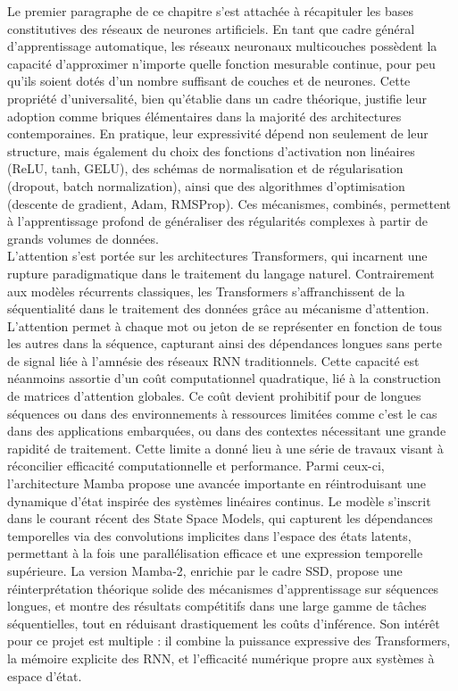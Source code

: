 Le premier paragraphe de ce chapitre s’est attachée à récapituler les bases constitutives des réseaux de neurones artificiels. En tant que cadre général d’apprentissage automatique, les réseaux neuronaux multicouches possèdent la capacité d’approximer n’importe quelle fonction mesurable continue, pour peu qu’ils soient dotés d’un nombre suffisant de couches et de neurones. Cette propriété d’universalité, bien qu’établie dans un cadre théorique, justifie leur adoption comme briques élémentaires dans la majorité des architectures contemporaines. En pratique, leur expressivité dépend non seulement de leur structure, mais également du choix des fonctions d’activation non linéaires (ReLU, tanh, GELU), des schémas de normalisation et de régularisation (dropout, batch normalization), ainsi que des algorithmes d’optimisation (descente de gradient, Adam, RMSProp). Ces mécanismes, combinés, permettent à l’apprentissage profond de généraliser des régularités complexes à partir de grands volumes de données.\\

L’attention s’est portée sur les architectures Transformers, qui incarnent une rupture paradigmatique dans le traitement du langage naturel. Contrairement aux modèles récurrents classiques, les Transformers s’affranchissent de la séquentialité dans le traitement des données grâce au mécanisme d’attention. L’attention permet à chaque mot ou jeton de se représenter en fonction de tous les autres dans la séquence, capturant ainsi des dépendances longues sans perte de signal liée à l’amnésie des réseaux RNN traditionnels. Cette capacité est néanmoins assortie d’un coût computationnel quadratique, lié à la construction de matrices d’attention globales. Ce coût devient prohibitif pour de longues séquences ou dans des environnements à ressources limitées comme c’est le cas dans des applications embarquées, ou dans des contextes nécessitant une grande rapidité de traitement. Cette limite a donné lieu à une série de travaux visant à réconcilier efficacité computationnelle et performance. Parmi ceux-ci, l’architecture Mamba propose une avancée importante en réintroduisant une dynamique d’état inspirée des systèmes linéaires continus. Le modèle s’inscrit dans le courant récent des State Space Models, qui capturent les dépendances temporelles via des convolutions implicites dans l’espace des états latents, permettant à la fois une parallélisation efficace et une expression temporelle supérieure. La version Mamba-2, enrichie par le cadre SSD, propose une réinterprétation théorique solide des mécanismes d’apprentissage sur séquences longues, et montre des résultats compétitifs dans une large gamme de tâches séquentielles, tout en réduisant drastiquement les coûts d’inférence. Son intérêt pour ce projet est multiple : il combine la puissance expressive des Transformers, la mémoire explicite des RNN, et l’efficacité numérique propre aux systèmes à espace d’état.\\

